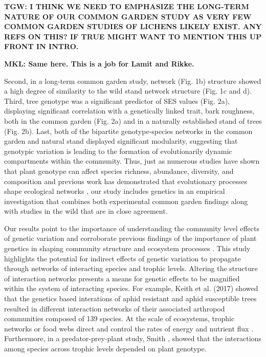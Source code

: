 \documentclass[fleqn,10pt]{wlscirep}
\begin{document}
\textbf{TGW: I THINK WE NEED TO EMPHASIZE THE LONG-TERM NATURE OF OUR
COMMON GARDEN STUDY AS VERY FEW COMMON GARDEN STUDIES OF LICHENS
LIKELY EXIST. ANY REFS ON THIS? IF TRUE MIGHT WANT TO MENTION THIS UP
FRONT IN INTRO.}

\textbf{MKL: Same here. This is a job for Lamit and Rikke.}

Second, in a long-term common garden study, network
(Fig. 1b) structure showed a high degree of similarity to the wild
stand network structure (Fig. 1c and d). Third, tree genotype was a
significant predictor of SES values (Fig. 2a), displaying significant
correlation with a genetically linked trait, bark roughness, both in
the common garden (Fig. 2a) and in a naturally established stand of
trees (Fig. 2b). Last, both of the bipartite genotype-species networks
in the common garden and natural stand displayed significant
modularity, suggesting that genotypic variation is leading to the
formation of evolutionarily dynamic compartments within the
community. Thus, just as numerous studies have shown that plant
genotype can affect species richness, abundance, diversity, and
composition and previous work has demonstrated that evolutionary
processes shape ecological networks \cite{Guimaraes2011,
  Moya-Larano2011}, our study includes genetics in an empirical
investigation that combines both experimental common garden findings
along with studies in the wild that are in close agreement.

Our results point to the importance of understanding the community
level effects of genetic variation and corroborate previous findings
of the importance of plant genetics in shaping community structure and
ecosystem processes \cite{Whitham2006a}.  This study highlights the
potential for indirect effects of genetic variation to propagate
through networks of interacting species and trophic levels. Altering
the structure of interaction networks presents a means for genetic
effects to be magnified within the system of interacting species. For
example, Keith et al. (2017) showed that the genetics based
interations of aphid resistant and aphid susceptible trees resulted in
different interaction networks of their associated arthropod
communities composed of 139 species. At the scale of ecosystems,
trophic networks or food webs direct and control the rates of energy
and nutrient flux \cite{Borgatti2006}. Furthermore, in a
predator-prey-plant study, Smith \cite{Smith2011}, showed that the
interactions among species across trophic levels depended on plant
genotype.
\end{document}
